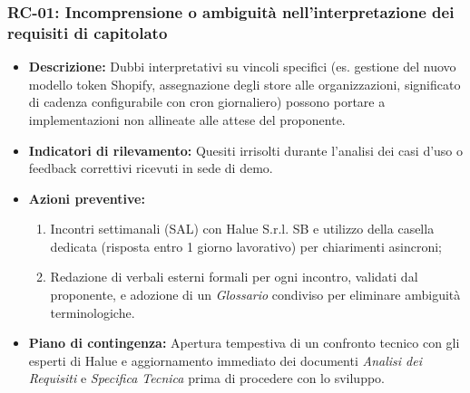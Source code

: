 \subsubsection{RC-01: Incomprensione o ambiguità nell'interpretazione dei requisiti di capitolato}
\begin{itemize}
    \item \textbf{Descrizione:} Dubbi interpretativi su vincoli specifici (es. gestione del nuovo modello token Shopify, assegnazione degli store alle organizzazioni, significato di cadenza configurabile con cron giornaliero) possono portare a implementazioni non allineate alle attese del proponente.
    \item \textbf{Indicatori di rilevamento:} Quesiti irrisolti durante l'analisi dei casi d'uso o feedback correttivi ricevuti in sede di demo.
    \item \textbf{Azioni preventive:}
    \begin{enumerate}
        \item Incontri settimanali (SAL) con Halue S.r.l. SB e utilizzo della casella dedicata (risposta entro 1 giorno lavorativo) per chiarimenti asincroni;
        \item Redazione di verbali esterni formali per ogni incontro, validati dal proponente, e adozione di un \textit{Glossario} condiviso per eliminare ambiguità terminologiche.
    \end{enumerate}
    \item \textbf{Piano di contingenza:} Apertura tempestiva di un confronto tecnico con gli esperti di Halue e aggiornamento immediato dei documenti \textit{Analisi dei Requisiti} e \textit{Specifica Tecnica} prima di procedere con lo sviluppo.
\end{itemize}

